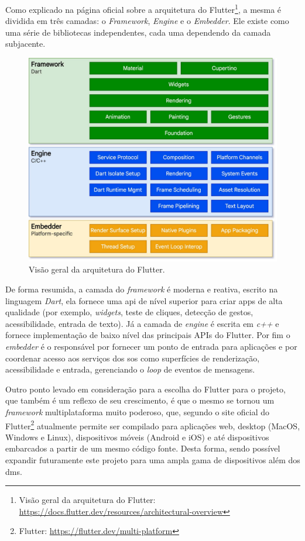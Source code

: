 Como explicado na página oficial sobre a arquitetura do Flutter\footnote{\label{flutter_arch}Visão geral da arquitetura do Flutter: \url{https://docs.flutter.dev/resources/architectural-overview}}, a mesma é dividida em três camadas: o \textit{Framework}, \textit{Engine} e o \textit{Embedder}. Ele existe como uma série de bibliotecas independentes, cada uma dependendo da camada subjacente. 

\begin{figure}[H]
\centering
  \includegraphics[width=\columnwidth]{images/flutter-archdiagram.pdf}
  \caption{Visão geral da arquitetura do Flutter.}
  \label{fig:flutter-archdiagram}
\end{figure}

De forma resumida, a camada do \textit{framework} é moderna e reativa, escrito na linguagem \textit{Dart}, ela fornece uma \ac{api} de nível superior para criar \acp{app} de alta qualidade (por exemplo, \textit{widgets}, teste de cliques, detecção de gestos, acessibilidade, entrada de texto). Já a camada de \textit{engine} é escrita em \textit{c++} e fornece implementação de baixo nível das principais APIs do Flutter. Por fim o \textit{embedder} é o responsável por fornecer um ponto de entrada para aplicações e por coordenar acesso aos serviços dos \acp{so} como superfícies de renderização, acessibilidade e entrada, gerenciando o \textit{loop} de eventos de mensagens.

Outro ponto levado em consideração para a escolha do Flutter para o projeto, que também é um reflexo de seu crescimento, é que o mesmo se tornou um \textit{framework} multiplataforma muito poderoso, que, segundo o site oficial do Flutter\footnote{Flutter: \url{https://flutter.dev/multi-platform}} atualmente permite ser compilado para aplicações web, desktop (MacOS, Windows e Linux), dispositivos móveis (Android e iOS) e até dispositivos embarcados a partir de um mesmo código fonte. Desta forma, sendo possível expandir futuramente este projeto para uma ampla gama de dispositivos além dos \acp{dm}.


